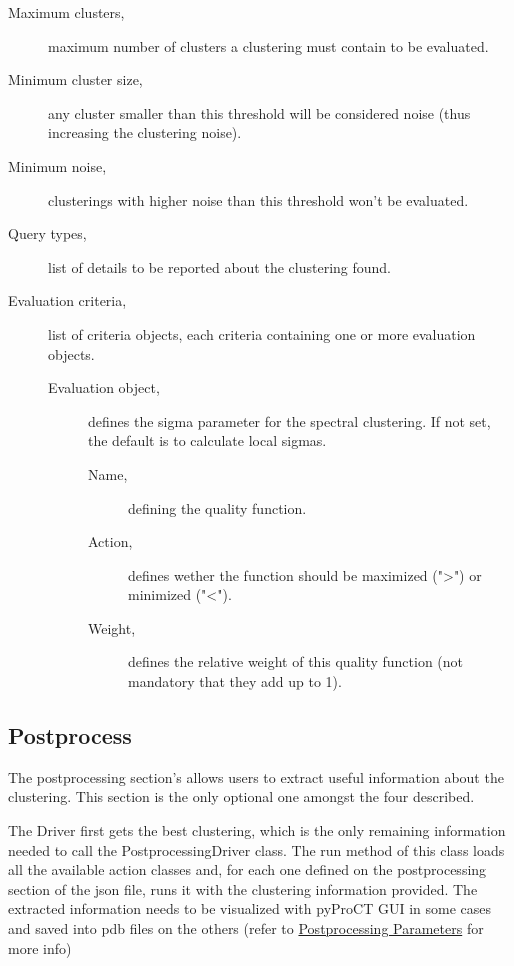 \begin{description}
\begin{description}
\item [Maximum clusters,] maximum number of clusters a clustering must contain to be evaluated.
\item [Minimum cluster size,] any cluster smaller than this threshold will be considered noise (thus increasing the clustering noise).
\item [Minimum noise,] clusterings with higher noise than this threshold won't be evaluated.
\item [Query types,] list of details to be reported about the clustering found.
\item [Evaluation criteria,] list of criteria objects, each criteria containing one or more evaluation objects.
\begin{description}
\item [Evaluation object,] defines the sigma parameter for the spectral clustering. If not set, the default is to calculate local sigmas.
\begin{description}
\item [Name,] defining the quality function.
\item [Action,] defines wether the function should be maximized (">") or minimized ("<"). 
\item [Weight,] defines the relative weight of this quality function (not mandatory that they add up to 1).
\end{description}
\end{description} 
\end{description}
\end{description}



\subsection{Postprocess}

The postprocessing section's allows users to extract useful information about the clustering. This section is the only optional one amongst the four described. 

The Driver first gets the best clustering, which is the only remaining information needed to call the PostprocessingDriver class. The run method of this class loads all the available action classes and, for each one defined on the postprocessing section of the json file, runs it with the clustering information provided. The extracted information needs to be visualized with pyProCT GUI in some cases and saved into pdb files on the others (refer to \hyperref[subsec:postprocess:params]{Postprocessing Parameters} for more info)




